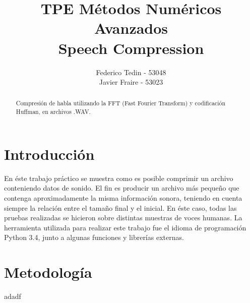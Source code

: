 \documentclass[12pt,a4paper]{article}
\title{TPE Métodos Numéricos Avanzados\\Speech Compression}
\author{Federico Tedin - 53048\\Javier Fraire - 53023}
\begin{document}
\maketitle

\begin{abstract}

\centering
Compresión de habla utilizando la FFT (Fast Fourier Transform) y codificación Huffman, en archivos .WAV.

\end{abstract}

\clearpage
\tableofcontents
\clearpage

\section{Introducción}
En éste trabajo práctico se muestra como es posible comprimir un archivo conteniendo datos de sonido. El fin es producir un archivo más pequeño que contenga aproximadamente la misma información sonora, teniendo en cuenta siempre la relación entre el tamaño final y el inicial.  En éste caso, todas las pruebas realizadas se hicieron sobre distintas muestras de voces humanas.  La herramienta utilizada para realizar este trabajo fue el idioma de programación Python 3.4, junto a algunas funciones y librerías externas.

\section{Metodología}

adadf
\end{document}

